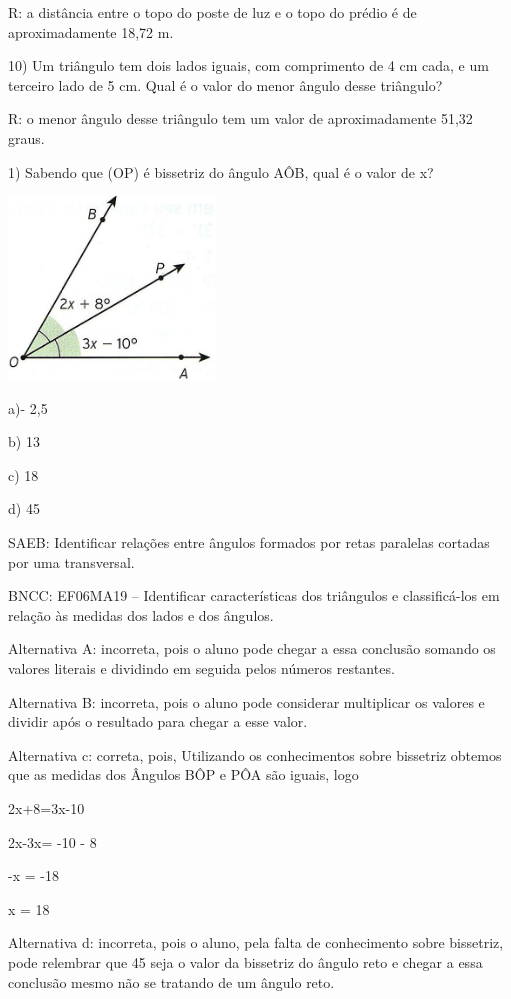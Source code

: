 R: a distância entre o topo do poste de luz e o topo do prédio é de
aproximadamente 18,72 m.

10) Um triângulo tem dois lados iguais, com comprimento de 4 cm cada, e
um terceiro lado de 5 cm. Qual é o valor do menor ângulo desse
triângulo?

R: o menor ângulo desse triângulo tem um valor de aproximadamente 51,32
graus.


1) Sabendo que (OP) é bissetriz do ângulo AÔB, qual é o valor de x?

\includegraphics[width=2.17708in,height=1.91619in]{./imgSAEB_6_MAT/media/image62.jpeg}

a)- 2,5

b) 13

c) 18

d) 45

SAEB: Identificar relações entre ângulos formados por retas paralelas
cortadas por uma transversal.

BNCC: EF06MA19 -- Identificar características dos triângulos e
classificá-los em relação às medidas dos lados e dos ângulos.

Alternativa A: incorreta, pois o aluno pode chegar a essa conclusão
somando os valores literais e dividindo em seguida pelos números
restantes.

Alternativa B: incorreta, pois o aluno pode considerar multiplicar os
valores e dividir após o resultado para chegar a esse valor.

Alternativa c: correta, pois, Utilizando os conhecimentos sobre
bissetriz obtemos que as medidas dos Ângulos BÔP e PÔA são iguais, logo

2x+8=3x-10

2x-3x= -10 - 8

-x = -18

x = 18

Alternativa d: incorreta, pois o aluno, pela falta de conhecimento sobre
bissetriz, pode relembrar que 45 seja o valor da bissetriz do ângulo
reto e chegar a essa conclusão mesmo não se tratando de um ângulo reto.

